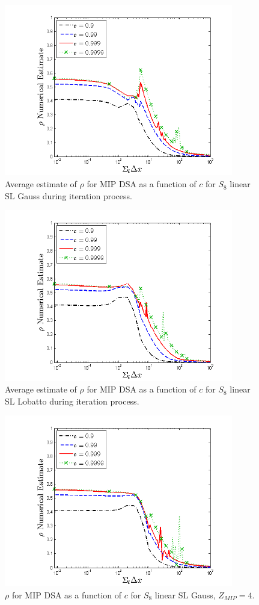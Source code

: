 %
%
\begin{figure}[!htp]
\centering
\includegraphics[width=10cm]{chapter4_acceleration/Const_2_bar_Constant_XS_c_comparions_MIP_Gauss.png}
\caption{Average estimate of $\rho$ for MIP DSA as a function of $c$  for  $S_8$  linear SL Gauss during iteration process.}
\label{fig:mip_gauss_as_fun_c_bar}
\end{figure}
%
\begin{figure}[!hbp]
\centering
\includegraphics[width=10cm]{chapter4_acceleration/Const_2_bar_Constant_XS_c_comparions_MIP_Lobatto.png}
\caption{Average estimate of $\rho$ for MIP DSA as a function of $c$  for  $S_8$  linear SL Lobatto during iteration process.}
\label{fig:mip_lobatto_as_fun_c_bar}
\end{figure}
%
\pagebreak
%
\begin{figure}[!htp]
\centering
\includegraphics[width=10cm]{chapter4_acceleration/Const_4_Constant_XS_c_comparions_MIP_Gauss.png}
\caption{$\rho$ for MIP DSA as a function of $c$  for  $S_8$  linear SL Gauss, $Z_{MIP}=4$.}
\label{fig:mip_gauss_as_fun_c_z4}
\end{figure}
